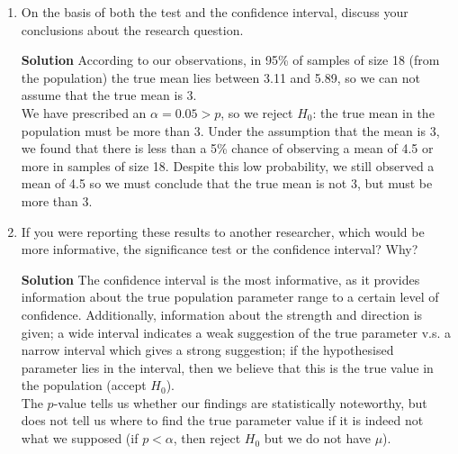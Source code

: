 \begin{enumerate}
\begin{enumerate}
        \item On the basis of both the test and the confidence interval, discuss your conclusions about the research question.
        \begin{framed}{\textbf{Solution}}
        According to our observations, in 95\% of samples of size 18 (from the population) the true mean lies between 3.11 and 5.89, so we can not assume that the true mean is 3. 
        \\
        We have prescribed an $\alpha = 0.05>p$, so we reject $H_0$: the true mean in the population must be more than 3. Under the assumption that the mean is 3, we found that there is less than a 5\% chance of observing a mean of 4.5 or more in samples of size 18. Despite this low probability, we still observed a mean of 4.5 so we must conclude that the true mean is not 3, but must be more than 3. 
        \end{framed}
        
        \item If you were reporting these results to another researcher, which would be more informative, the significance test or the confidence interval? Why?
        \begin{framed}{\textbf{Solution}}
        The confidence interval is the most informative, as it provides information about the true population parameter range to a certain level of confidence. Additionally, information about the strength and direction is given; a wide interval indicates a weak suggestion of the true parameter v.s. a narrow interval which gives a strong suggestion; if the hypothesised parameter lies in the interval, then we believe that this is the true value in the population (accept $H_0$). \\
        The $p$-value tells us whether our findings are statistically noteworthy, but does not tell us where to find the true parameter value if it is indeed not what we supposed (if $p<\alpha$, then reject $H_0$ but we do not have $\mu$).
        \end{framed}
    \end{enumerate}
    

\end{enumerate}
